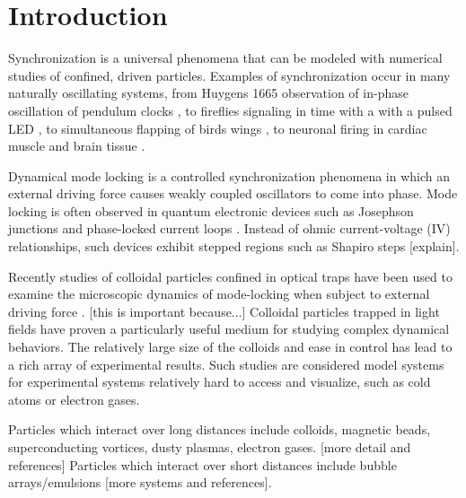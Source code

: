\documentclass[prb,preprint]{revtex4}
\begin{document}
\section{Introduction} %
%
Synchronization is a universal phenomena
that can be modeled with numerical studies of confined,
driven particles.
Examples of synchronization occur
in many naturally oscillating systems,
from Huygens 1665 observation of
in-phase oscillation of pendulum clocks \cite{Pikovsky2003},
to fireflies signaling in time with a with a pulsed LED \cite{},
to simultaneous flapping of birds wings \cite{},
to neuronal firing in cardiac muscle \cite{} and brain tissue \cite{}.

Dynamical mode locking is a controlled 
synchronization phenomena in 
which an external driving force
causes
weakly coupled oscillators to come into phase.
Mode locking is often observed in quantum electronic
devices such as Josephson junctions \cite{}
and phase-locked current loops \cite{}.
Instead of ohmic current-voltage (IV) relationships,
such devices exhibit stepped regions
such as Shapiro steps \cite{} [explain].

Recently studies of colloidal particles confined
in optical traps have
been used to examine the microscopic dynamics
of mode-locking when subject to external driving force \cite{juniper2015}.
[this is important because...]
Colloidal particles trapped in light fields have proven
a particularly useful medium for studying complex dynamical behaviors.  %
The relatively large size of the colloids
and ease in control has lead to a rich array of 
experimental results. %
Such studies are considered model systems
for experimental systems relatively hard to access and visualize,
such as cold atoms or electron gases. %

Particles which interact over long distances
include colloids, magnetic beads, superconducting vortices, dusty plasmas, electron gases. [more detail and references]
Particles which interact over short distances include
bubble arrays/emulsions [more systems and references].
\end{document}
